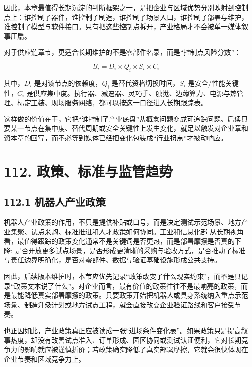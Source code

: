 因此，本章最值得长期沉淀的判断框架之一，是把企业与区域优势分别映射到控制点上：谁控制了器件，谁控制了制造，谁控制了场景入口，谁控制了部署与维护，谁控制了模型与软件接口。只有把这些控制点拆开，产业格局才不会被单一媒体叙事压扁。

对于供应链章节，更适合长期维护的不是零部件名录，而是“控制点风险分数”：

\begin{equation*}
B_i = D_i \times Q_i \times S_i \times C_i
\end{equation*}

其中，\(D_i\) 是对该节点的依赖度，\(Q_i\) 是替代资格切换时间，\(S_i\) 是安全/性能关键性，\(C_i\) 是供应集中度。执行器、减速器、灵巧手、触觉、边缘算力、电源与热管理、标定工装、现场服务网络，都可以按这一口径进入长期跟踪表。

这样做的价值在于，它把“谁控制了产业底盘”从概念问题变成可追踪问题。后续只要某一节点在集中度、替代周期或安全关键性上发生变化，就足以触发对企业章和资本章的回写，而不必等到媒体已经把变化包装成“行业拐点”才被动响应。

\chapter*{112. 政策、标准与监管趋势}

\section*{112.1 机器人产业政策}


机器人产业政策的作用，不只是提供补贴或口号，而是决定测试示范场景、地方产业集聚、试点采购、标准推进和人才政策如何协同。\href{https://www.miit.gov.cn/}{工业和信息化部} 从长期视角看，最值得跟踪的政策变化通常不是关键词是否更热，而是部署摩擦是否真的下降: 是否开放更多试点场景，是否形成更清晰的采购与验收方式，是否推动了标准与责任边界明确化，是否对零部件、数据与验证基础设施形成公共支持。

因此，后续版本维护时，本节应优先记录“政策改变了什么现实约束”，而不是只记录“政策文本说了什么”。对企业而言，最有价值的政策往往不是最响亮的政策，而是最能降低真实部署摩擦的政策。只要政策开始把机器人或具身系统纳入重点示范场景、制造升级计划或地方试点工程，就会直接改变企业验证路线和客户接受节奏。

也正因如此，产业政策真正应被读成一张“进场条件变化表”。如果政策只是提高叙事热度，却没有改善试点准入、订单形成、园区协同或测试认证便利，它对长期竞争力的影响就应被谨慎折价；若政策确实降低了真实部署摩擦，它就会很快体现在企业节奏和区域竞争力上。

